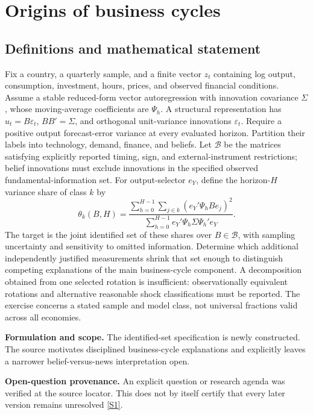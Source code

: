 \documentclass[11pt]{article}
\newcommand{\sref}[2]{\hyperlink{source:#1:#2}{[S#2]}}
\begin{document}
\section*{Origins of business cycles}\label{30007512}
\subsection{Definitions and mathematical statement}
Fix a country, a quarterly sample, and a finite vector \(z_t\) containing log output, consumption, investment, hours, prices, and observed financial conditions. Assume a stable reduced-form vector autoregression with innovation covariance \(\Sigma\), whose moving-average coefficients are \(\Psi_h\). A structural representation has \(u_t=B\varepsilon_t\), \(BB'=\Sigma\), and orthogonal unit-variance innovations \(\varepsilon_t\). Require a positive output forecast-error variance at every evaluated horizon. Partition their labels into technology, demand, finance, and beliefs. Let \(\mathcal B\) be the matrices satisfying explicitly reported timing, sign, and external-instrument restrictions; belief innovations must exclude innovations in the specified observed fundamental-information set.
For output-selector \(e_Y\), define the horizon-\(H\) variance share of class \(k\) by
\[
\theta_k(B,H)=\frac{\sum_{h=0}^{H-1}\sum_{j\in k}(e_Y'\Psi_hB e_j)^2}
{\sum_{h=0}^{H-1}e_Y'\Psi_h\Sigma\Psi_h'e_Y}.
\]
The target is the joint identified set of these shares over \(B\in\mathcal B\), with sampling uncertainty and sensitivity to omitted information. Determine which additional independently justified measurements shrink that set enough to distinguish competing explanations of the main business-cycle component. A decomposition obtained from one selected rotation is insufficient: observationally equivalent rotations and alternative reasonable shock classifications must be reported. The exercise concerns a stated sample and model class, not universal fractions valid across all economies.

\par\textbf{Formulation and scope.} The identified-set specification is newly constructed. The source motivates disciplined business-cycle explanations and explicitly leaves a narrower belief-versus-news interpretation open.

\par\textbf{Open-question provenance.} An explicit question or research agenda was verified at the source locator. This does not by itself certify that every later version remains unresolved \sref{30007512}{1}.
\end{document}
